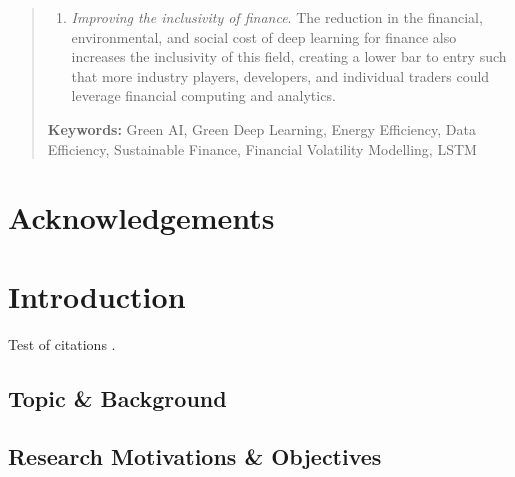\documentclass[a4paper, 12pt]{report}
\begin{document}
\begin{abstract}
\begin{enumerate}
            \item \emph{Improving the inclusivity of finance}. The reduction in the financial, environmental, and social cost of deep learning for finance also increases the inclusivity of this field, creating a lower bar to entry such that more industry players, developers, and individual traders could leverage financial computing and analytics.
        \end{enumerate}

        \vspace{1cm}
        \noindent
        \textbf{Keywords:} Green AI, Green Deep Learning, Energy Efficiency, Data Efficiency, Sustainable Finance, Financial Volatility Modelling, LSTM

    \end{abstract}


    \newpage
    \chapter*{Acknowledgements}
    \blindtext 


    \newpage
    \tableofcontents


    \newpage 
    \listoffigures


    \newpage
    \listoftables 




    \newpage
    \chapter{Introduction}

    Test of citations \citep{xu-2021}.

    \section{Topic \& Background}

    \section{Research Motivations \& Objectives}
\end{document}
